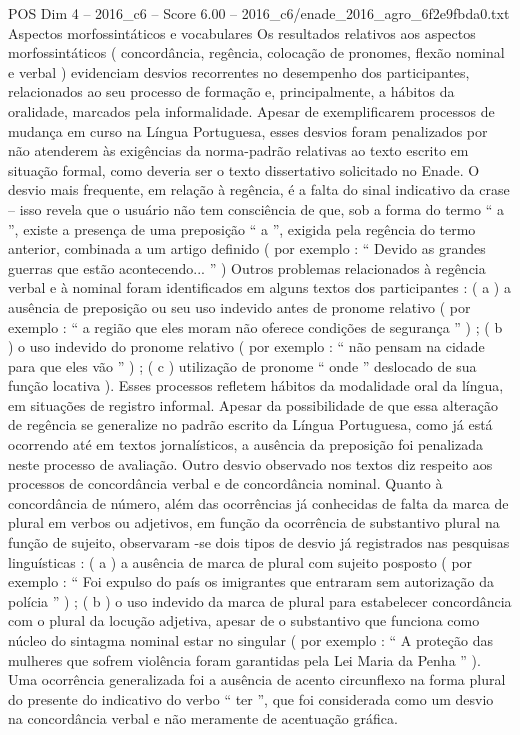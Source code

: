 \begin{textsample}{POS Dim 4 – 2016\_c6 – Score 6.00 – 2016\_c6/enade\_2016\_agro\_6f2e9fbda0.txt}
Aspectos morfossintáticos e vocabulares Os resultados relativos aos aspectos morfossintáticos ( concordância, regência, colocação de pronomes, flexão nominal e verbal ) evidenciam desvios recorrentes no desempenho dos participantes, relacionados ao seu processo de formação e, principalmente, a hábitos da oralidade, marcados pela informalidade.
Apesar de exemplificarem processos de mudança em curso na Língua Portuguesa, esses desvios foram penalizados por não atenderem às exigências da norma-padrão relativas ao texto escrito em situação formal, como deveria ser o texto dissertativo solicitado no Enade.
O desvio mais frequente, em relação à regência, é a falta do sinal indicativo da crase – isso revela que o usuário não tem consciência de que, sob a forma do termo “ a ”, existe a presença de uma preposição “ a ”, exigida pela regência do termo anterior, combinada a um artigo definido ( por exemplo : “ Devido as grandes guerras que estão acontecendo... ” ) Outros problemas relacionados à regência verbal e à nominal foram identificados em alguns textos dos participantes : ( a ) a ausência de preposição ou seu uso indevido antes de pronome relativo ( por exemplo : “ a região que eles moram não oferece condições de segurança ” ) ; ( b ) o uso indevido do pronome relativo ( por exemplo : “ não pensam na cidade para que eles vão ” ) ; ( c ) utilização de pronome “ onde ” deslocado de sua função locativa ).
Esses processos refletem hábitos da modalidade oral da língua, em situações de registro informal.
Apesar da possibilidade de que essa alteração de regência se generalize no padrão escrito da Língua Portuguesa, como já está ocorrendo até em textos jornalísticos, a ausência da preposição foi penalizada neste processo de avaliação.
Outro desvio observado nos textos diz respeito aos processos de concordância verbal e de concordância nominal.
Quanto à concordância de número, além das ocorrências já conhecidas de falta da marca de plural em verbos ou adjetivos, em função da ocorrência de substantivo plural na função de sujeito, observaram -se dois tipos de desvio já registrados nas pesquisas linguísticas : ( a ) a ausência de marca de plural com sujeito posposto ( por exemplo : “ Foi expulso do país os imigrantes que entraram sem autorização da polícia ” ) ; ( b ) o uso indevido da marca de plural para estabelecer concordância com o plural da locução adjetiva, apesar de o substantivo que funciona como núcleo do sintagma nominal estar no singular ( por exemplo : “ A proteção das mulheres que sofrem violência foram garantidas pela Lei Maria da Penha ” ).
Uma ocorrência generalizada foi a ausência de acento circunflexo na forma plural do presente do indicativo do verbo “ ter ”, que foi considerada como um desvio na concordância verbal e não meramente de acentuação gráfica.

\end{textsample}
